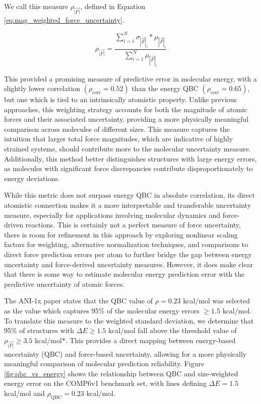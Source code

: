 We call this measure $\rho_{\vec{|F|}}$, defined in Equation \ref{eq:mag_weighted_force_uncertainty}.

\begin{equation}
    \rho_{\vec{|F|}} = \frac{\sum_{i=1}^{N} \sigma_{|\vec{F}|_i}* \mu_{|\vec{F}|_i}}{\sum_{i=1}^{N} \mu_{|\vec{F}|_i}}
    \label{eq:mag_weighted_force_uncertainty}
\end{equation}

This provided a promising measure of predictive error in molecular energy, with a slightly lower correlation $(\rho_\text{corr} = 0.52)$ than the energy QBC $(\rho_\text{corr} = 0.65)$, but one which is tied to an intrinsically atomistic property.
Unlike previous approaches, this weighting strategy accounts for both the magnitude of atomic forces and their associated uncertainty, providing a more physically meaningful comparison across molecules of different sizes.
This measure captures the intuition that larger total force magnitudes, which are indicative of highly strained systems, should contribute more to the molecular uncertainty measure.
Additionally, this method better distinguishes structures with large energy errors, as molecules with significant force discrepancies contribute disproportionately to energy deviations.

While this metric does not surpass energy QBC in absolute correlation, its direct atomistic connection makes it a more interpretable and transferable uncertainty measure, especially for applications involving molecular dynamics and force-driven reactions.
This is certainly not a perfect measure of force uncertainty, there is room for refinement in this approach by exploring nonlinear scaling factors for weighting, alternative normalization techniques, and comparisons to direct force prediction errors per atom to further bridge the gap between energy uncertainty and force-derived uncertainty measures.
However, it does make clear that there is some way to estimate molecular energy prediction error with the predictive uncertainty of atomic forces.

The ANI-1x paper \cite{ani-1x} states that the QBC value of $\rho = 0.23$ kcal/mol was selected as the value which captures 95\% of the molecular energy errors $\geq 1.5$ kcal/mol.
To translate this measure to the weighted standard deviation, we determine that 95\% of structures with $\Delta E \geq 1.5$ kcal/mol fall above the 
threshold value of $\rho_{\vec{|F|}} \geq 3.5$ kcal/mol*\angstrom. 
This provides a direct mapping between energy-based uncertainty (QBC) and force-based uncertainty, allowing for a more physically meaningful comparison of molecular prediction reliability.
Figure \ref{fig:qbc_vs_energy} shows the relationship between QBC and size-weighted energy error on the COMP6v1 benchmark set, with lines defining $\Delta E = 1.5$ kcal/mol and $\rho_\text{QBC} = 0.23$ kcal/mol.

